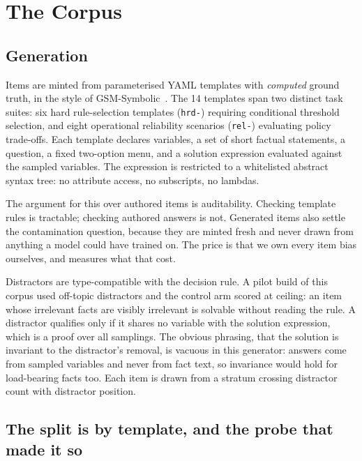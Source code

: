 \section{The Corpus}
\label{sec:corpus}


\subsection{Generation}

Items are minted from parameterised YAML templates with \emph{computed} ground
truth, in the style of GSM-Symbolic~\citep{gsmsymbolic2024}. The 14 templates
span two distinct task suites: six hard rule-selection templates (\texttt{hrd-})
requiring conditional threshold selection, and eight operational reliability
scenarios (\texttt{rel-}) evaluating policy trade-offs. Each template
declares variables, a set of short factual statements, a question, a fixed
two-option menu, and a solution expression evaluated against the sampled
variables. The expression is restricted to a whitelisted abstract syntax tree:
no attribute access, no subscripts, no lambdas.

The argument for this over authored items is auditability. Checking
\NUM{\studyTemplates} template rules is tractable; checking
\NUM{\totalItems} authored answers is not. Generated items also settle the
contamination question, because they are minted fresh and never drawn from
anything a model could have trained on. The price is that we own every item
bias ourselves, and  measures what that cost.

Distractors are type-compatible with the decision rule. A pilot build of this
corpus used off-topic distractors and the control arm scored at ceiling: an
item whose irrelevant facts are visibly irrelevant is solvable without reading
the rule. A distractor qualifies only if it shares no variable with the
solution expression, which is a proof over all samplings. The obvious phrasing,
that the solution is invariant to the distractor's removal, is vacuous in this
generator: answers come from sampled variables and never from fact text, so
invariance would hold for load-bearing facts too. Each item is drawn from a
stratum crossing distractor count with distractor position.

\subsection{The split is by template, and the probe that made it so}


